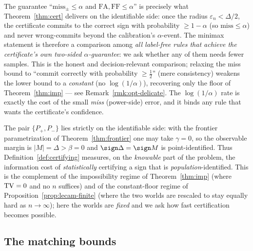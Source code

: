 \begin{remark}\label{rmk:miss-bound}
The guarantee ``$\mathrm{miss}_\pm\le\alpha$ and $\mathrm{FA},\mathrm{FF}\le\alpha$'' is precisely
what Theorem~\ref{thm:cert} delivers on the identifiable side: once the radius
$\varepsilon_n<\Delta/2$, the certificate commits to the correct sign with probability $\ge1-\alpha$
(so $\mathrm{miss}\le\alpha$) and never wrong-commits beyond the calibration's $\alpha$-event. The
minimax statement is therefore a comparison among \emph{all label-free rules that achieve the
certificate's own two-sided $\alpha$-guarantee}: we ask whether any of them needs fewer samples.
This is the honest and decision-relevant comparison; relaxing the miss bound to ``commit correctly
with probability $\ge\tfrac12$'' (mere consistency) weakens the lower bound to a \emph{constant}
(no $\log(1/\alpha)$), recovering only the floor of Theorem~\ref{thm:imp} ---
see Remark~\ref{rmk:opt-delicate}. The $\log(1/\alpha)$ rate is exactly the cost of the small
\emph{miss} (power-side) error, and it binds any rule that wants the certificate's confidence.
\end{remark}

\noindent The pair $\{P_+,P_-\}$ lies strictly on the identifiable side: with the frontier
parametrization of Theorem~\ref{thm:frontier} one may take $\gamma=0$, so the observable margin
is $|M|=\Delta>\beta=0$ and $\sign\Delta=\sign M$ is point-identified. Thus
Definition~\ref{def:certifying} measures, on the \emph{knowable} part of the problem, the
information cost of \emph{statistically} certifying a sign that is \emph{population}-identified.
This is the complement of the impossibility regime of Theorem~\ref{thm:imp} (where $\mathrm{TV}=0$ and no
$n$ suffices) and of the constant-floor regime of Proposition~\ref{prop:lecam-finite} (where the
two worlds are rescaled to stay equally hard as $n\to\infty$); here the worlds are
\emph{fixed} and we ask how fast certification becomes possible.

\subsection{The matching bounds}


